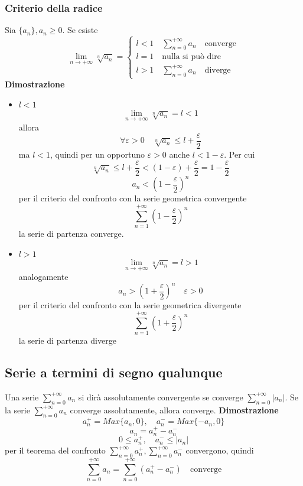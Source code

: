 \documentclass[12pt]{article}
\begin{document}
\subsubsection{Criterio della radice}
Sia \(\{ a_n \}, a_n \geq 0\). Se esiste
\[
\lim_{n \to +\infty} \sqrt[n]{a_n} = \begin{cases}
l<1 \quad \sum_{n=0}^{+\infty} a_n \quad \text{converge}\\
l=1 \quad \text{nulla si può dire}\\
l>1 \quad \sum_{n=0}^{+\infty} a_n \quad \text{diverge}
\end{cases}
\]
\textbf{Dimostrazione}
\begin{itemize}
  \item $l<1$
  \[
  \lim_{n \to +\infty} \sqrt[n]{a_n} = l < 1
  \]
  allora 
  \[
  \forall \varepsilon > 0 \quad \sqrt[n]{a_n} \leq l + \frac{\varepsilon}{2}
  \]
  ma $l<1$, quindi per un opportuno $\varepsilon > 0$ anche $l< 1 - \varepsilon$. Per cui
  \[
  \sqrt[n]{a_n} \leq l + \frac{\varepsilon}{2} < (1-\varepsilon)+\frac{\varepsilon}{2} = 1 - \frac{\varepsilon}{2}
  \]
  \[
  a_n < \left(1 - \frac{\varepsilon}{2} \right)^n
  \] 
  per il criterio del confronto con la serie geometrica convergente 
  \[
  \sum_{n=1}^{+\infty} \left(1 - \frac{\varepsilon}{2} \right)^n
  \]
  la serie di partenza converge.
  \item $l>1$
  \[
  \lim_{n \to +\infty} \sqrt[n]{a_n} = l > 1
  \]
  analogamente
  \[
  a_n > \left(1 + \frac{\varepsilon}{2} \right)^n \quad \varepsilon>0
  \]
  per il criterio del confronto con la serie geometrica divergente
  \[
  \sum_{n=1}^{+\infty} \left(1 + \frac{\varepsilon}{2} \right)^n
  \]
  la serie di partenza diverge
\end{itemize}

\subsection{Serie a termini di segno qualunque}
Una serie \(\displaystyle \sum_{n=0}^{+\infty} a_n\) si dirà assolutamente convergente se converge \(\displaystyle \sum_{n=0}^{+\infty} |a_n|\). \newline
Se la serie \(\displaystyle \sum_{n=0}^{+\infty} a_n\) converge assolutamente, allora converge. \newline
\textbf{Dimostrazione}
\[
a_n^+ = Max\{ a_n, 0 \}, \quad a_n^- = Max\{ -a_n, 0 \}
\]
\[
a_n = a_n^+ - a_n^-
\]
\[
0\leq a_n^+, \quad a_n^- \leq |a_n|
\]
per il teorema del confronto \(\displaystyle \sum_{n=0}^{+\infty} a_n^+ , \sum_{n=0}^{+\infty} a_n^-\) convergono, quindi
\[
\sum_{n=0}^{+\infty} a_n = \sum_{n=0}^{+\infty} (a_n^+ -a_n^-) \quad \text{converge}
\]
\end{document}
